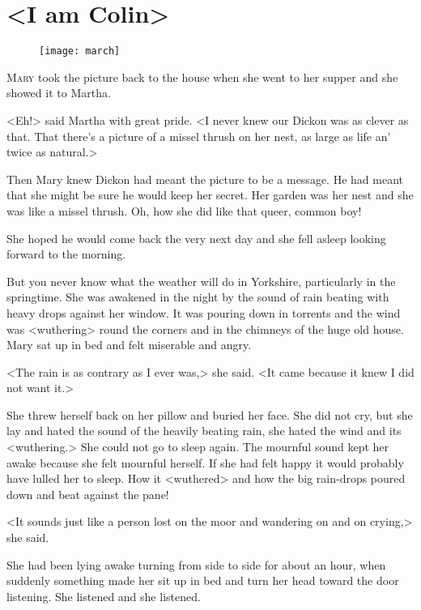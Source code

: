\chapter{<I am Colin>} 
	
\begin{figure}[t!]
\centering
\texttt{[image: march]}
\end{figure}

	\lettrine[]{M}{ary} took the picture back to the house when she went to her supper and she showed it to Martha.

\zz
<Eh!> said Martha with great pride. <I never knew our Dickon was as clever as that. That there's a picture of a missel thrush on her nest, as large as life an' twice as natural.>

\zz
Then Mary knew Dickon had meant the picture to be a message. He had meant that she might be sure he would keep her secret. Her garden was her nest and she was like a missel thrush. Oh, how she did like that queer, common boy!

She hoped he would come back the very next day and she fell asleep looking forward to the morning.

But you never know what the weather will do in Yorkshire, particularly in the springtime. She was awakened in the night by the sound of rain beating with heavy drops against her window. It was pouring down in torrents and the wind was <wuthering> round the corners and in the chimneys of the huge old house. Mary sat up in bed and felt miserable and angry.

<The rain is as contrary as I ever was,> she said. <It came because it knew I did not want it.>

She threw herself back on her pillow and buried her face. She did not cry, but she lay and hated the sound of the heavily beating rain, she hated the wind and its <wuthering.> She could not go to sleep again. The mournful sound kept her awake because she felt mournful herself. If she had felt happy it would probably have lulled her to sleep. How it <wuthered> and how the big rain-drops poured down and beat against the pane!

<It sounds just like a person lost on the moor and wandering on and on crying,> she said.

She had been lying awake turning from side to side for about an hour, when suddenly something made her sit up in bed and turn her head toward the door listening. She listened and she listened.

